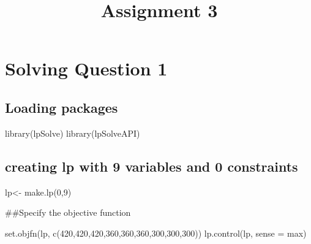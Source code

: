 \documentclass[
]{article}
\title{Assignment 3}
\author{}
\date{\vspace{-2.5em}}
\newenvironment{Shaded}{\begin{snugshade}}{\end{snugshade}}
\newcommand{\AttributeTok}[1]{\textcolor[rgb]{0.77,0.63,0.00}{#1}}
\newcommand{\DecValTok}[1]{\textcolor[rgb]{0.00,0.00,0.81}{#1}}
\newcommand{\FunctionTok}[1]{\textcolor[rgb]{0.00,0.00,0.00}{#1}}
\newcommand{\NormalTok}[1]{#1}
\newcommand{\OtherTok}[1]{\textcolor[rgb]{0.56,0.35,0.01}{#1}}
\newcommand{\StringTok}[1]{\textcolor[rgb]{0.31,0.60,0.02}{#1}}
\begin{document}
\maketitle

\hypertarget{solving-question-1}{%
\section{Solving Question 1}\label{solving-question-1}}

\hypertarget{loading-packages}{%
\subsection{Loading packages}\label{loading-packages}}

\begin{Shaded}
\begin{Highlighting}[]
\FunctionTok{library}\NormalTok{(lpSolve)}
\FunctionTok{library}\NormalTok{(lpSolveAPI)}
\end{Highlighting}
\end{Shaded}

\hypertarget{creating-lp-with-9-variables-and-0-constraints}{%
\subsection{creating lp with 9 variables and 0
constraints}\label{creating-lp-with-9-variables-and-0-constraints}}

\begin{Shaded}
\begin{Highlighting}[]
\NormalTok{lp}\OtherTok{\textless{}{-}} \FunctionTok{make.lp}\NormalTok{(}\DecValTok{0}\NormalTok{,}\DecValTok{9}\NormalTok{)}
\end{Highlighting}
\end{Shaded}

\#\#Specify the objective function

\begin{Shaded}
\begin{Highlighting}[]
\FunctionTok{set.objfn}\NormalTok{(lp, }\FunctionTok{c}\NormalTok{(}\DecValTok{420}\NormalTok{,}\DecValTok{420}\NormalTok{,}\DecValTok{420}\NormalTok{,}\DecValTok{360}\NormalTok{,}\DecValTok{360}\NormalTok{,}\DecValTok{360}\NormalTok{,}\DecValTok{300}\NormalTok{,}\DecValTok{300}\NormalTok{,}\DecValTok{300}\NormalTok{))}
\FunctionTok{lp.control}\NormalTok{(lp, }\AttributeTok{sense =} \StringTok{\textquotesingle{}max\textquotesingle{}}\NormalTok{)}
\end{Highlighting}
\end{Shaded}
\end{document}
